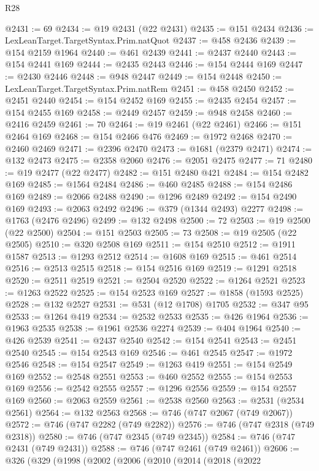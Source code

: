 \begin{lexlean}{R28}
\begin{coremodule}
@2431 := 69
@2434 := @19 @2431 (@22 @2431)
@2435 := @151 @2434
@2436 := LexLeanTarget.TargetSyntax.Prim.natQuot
@2437 := @458 @2436
@2439 := @154 @2159 @1964
@2440 := @461 @2439
@2441 := @2437 @2440
@2443 := @154 @2441 @169
@2444 := @2435 @2443
@2446 := @154 @2444 @169
@2447 := @2430 @2446
@2448 := @948 @2447
@2449 := @154 @2448
@2450 := LexLeanTarget.TargetSyntax.Prim.natRem
@2451 := @458 @2450
@2452 := @2451 @2440
@2454 := @154 @2452 @169
@2455 := @2435 @2454
@2457 := @154 @2455 @169
@2458 := @2449 @2457
@2459 := @948 @2458
@2460 := @2416 @2459
@2461 := 70
@2464 := @19 @2461 (@22 @2461)
@2466 := @151 @2464 @169
@2468 := @154 @2466 @476
@2469 := @1972 @2468
@2470 := @2460 @2469
@2471 := @2396 @2470
@2473 := @1681 (@2379 @2471)
@2474 := @132 @2473
@2475 := @2358 @2060
@2476 := @2051 @2475
@2477 := 71
@2480 := @19 @2477 (@22 @2477)
@2482 := @151 @2480 @421
@2484 := @154 @2482 @169
@2485 := @1564 @2484
@2486 := @460 @2485
@2488 := @154 @2486 @169
@2489 := @2066 @2488
@2490 := @1296 @2489
@2492 := @154 @2490 @169
@2493 := @2063 @2492
@2496 := @379 (@1344 @2493) @2277
@2498 := @1763 (@2476 @2496)
@2499 := @132 @2498
@2500 := 72
@2503 := @19 @2500 (@22 @2500)
@2504 := @151 @2503
@2505 := 73
@2508 := @19 @2505 (@22 @2505)
@2510 := @320 @2508 @169
@2511 := @154 @2510
@2512 := @1911 @1587
@2513 := @1293 @2512
@2514 := @1608 @169
@2515 := @461 @2514
@2516 := @2513 @2515
@2518 := @154 @2516 @169
@2519 := @1291 @2518
@2520 := @2511 @2519
@2521 := @2504 @2520
@2522 := @1264 @2521
@2523 := @1263 @2522
@2525 := @154 @2523 @169
@2527 := @1858 (@1593 @2525)
@2528 := @132 @2527
@2531 := @531 (@12 @1708) @1705
@2532 := @347 @95
@2533 := @1264 @419
@2534 := @2532 @2533
@2535 := @426 @1964
@2536 := @1963 @2535
@2538 := @1961 @2536 @2274
@2539 := @404 @1964
@2540 := @426 @2539
@2541 := @2437 @2540
@2542 := @154 @2541
@2543 := @2451 @2540
@2545 := @154 @2543 @169
@2546 := @461 @2545
@2547 := @1972 @2546
@2548 := @154 @2547
@2549 := @1263 @419
@2551 := @154 @2549 @169
@2552 := @2548 @2551
@2553 := @460 @2552
@2555 := @154 @2553 @169
@2556 := @2542 @2555
@2557 := @1296 @2556
@2559 := @154 @2557 @169
@2560 := @2063 @2559
@2561 := @2538 @2560
@2563 := @2531 (@2534 @2561)
@2564 := @132 @2563
@2568 := @746 (@747 @2067 (@749 @2067))
@2572 := @746 (@747 @2282 (@749 @2282))
@2576 := @746 (@747 @2318 (@749 @2318))
@2580 := @746 (@747 @2345 (@749 @2345))
@2584 := @746 (@747 @2431 (@749 @2431))
@2588 := @746 (@747 @2461 (@749 @2461))
@2606 := @326
    (@329
      (@1998
        (@2002
          (@2006
            (@2010
              (@2014
                (@2018
                  (@2022

\end{coremodule}
\end{lexlean}
